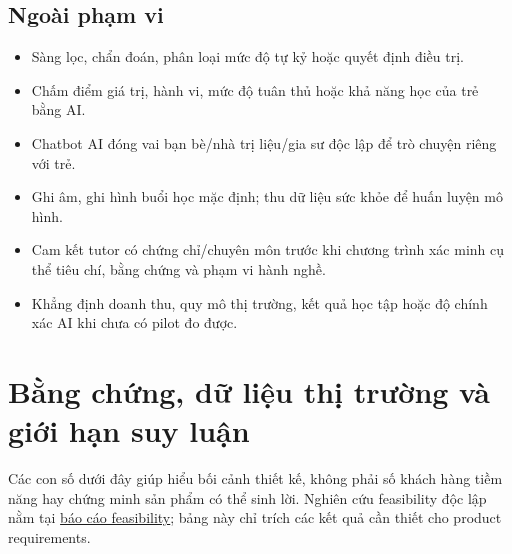 \documentclass[11pt,a4paper]{article}
\begin{document}
\subsection{Ngoài phạm vi}
\begin{itemize}
  \item Sàng lọc, chẩn đoán, phân loại mức độ tự kỷ hoặc quyết định điều trị.
  \item Chấm điểm giá trị, hành vi, mức độ tuân thủ hoặc khả năng học của trẻ bằng AI.
  \item Chatbot AI đóng vai bạn bè/nhà trị liệu/gia sư độc lập để trò chuyện riêng với trẻ.
  \item Ghi âm, ghi hình buổi học mặc định; thu dữ liệu sức khỏe để huấn luyện mô hình.
  \item Cam kết tutor có chứng chỉ/chuyên môn trước khi chương trình xác minh cụ thể tiêu chí, bằng chứng và phạm vi hành nghề.
  \item Khẳng định doanh thu, quy mô thị trường, kết quả học tập hoặc độ chính xác AI khi chưa có pilot đo được.
\end{itemize}

\section{Bằng chứng, dữ liệu thị trường và giới hạn suy luận}

Các con số dưới đây giúp hiểu bối cảnh thiết kế, không phải số khách hàng tiềm năng hay chứng minh sản phẩm có thể sinh lời. Nghiên cứu feasibility độc lập nằm tại \href{business-feasibility-autism-tutor-matching-vi.tex}{báo cáo feasibility}; bảng này chỉ trích các kết quả cần thiết cho product requirements.
\end{document}
